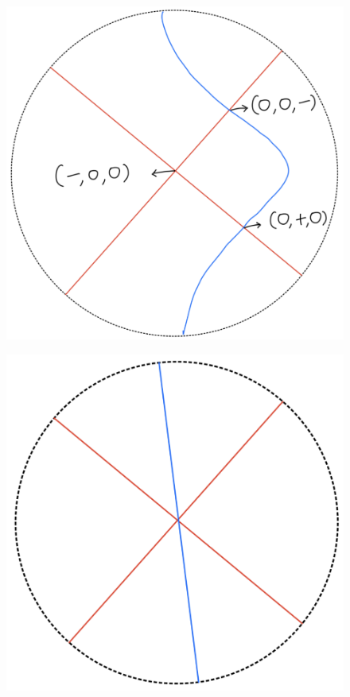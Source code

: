 \begin{definition}
\begin{enumerate}
\begin{itemize}
\begin{figure}[H]
    \centering
    \includegraphics[scale = 0.45]{diagrams/lemma4/13.png}
    \caption{}
    \label{fig:your-label}
\end{figure}
\begin{figure}[H]
    \centering
    \includegraphics[scale = 0.45]{diagrams/lemma4/14.png}

\end{figure}
\end{itemize}
\end{enumerate}
\end{definition}
